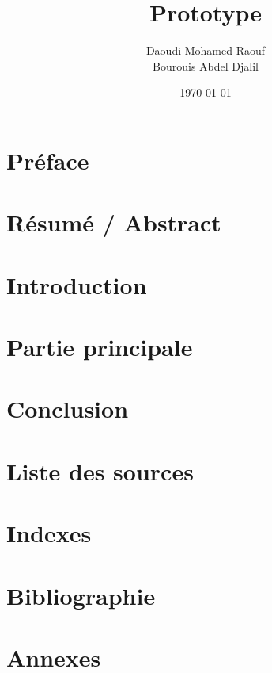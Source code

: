\documentclass[12pt,a4paper]{report}
\begin{document}
\title{Prototype}
\author{Daoudi Mohamed Raouf \\ Bourouis Abdel Djalil}

\date{\today}
\maketitle

\chapter*{Préface}

\tableofcontents

\chapter*{Résumé / Abstract}

\chapter{Introduction}

\chapter{Partie principale}

\chapter{Conclusion}

\chapter{Liste des sources}

\chapter{Indexes}

\chapter{Bibliographie}

\appendix
\chapter{Annexes}
\end{document}
